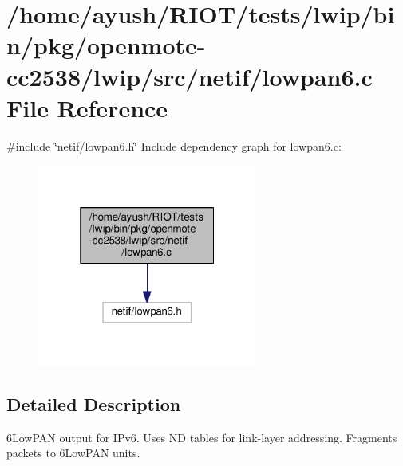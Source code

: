 \hypertarget{openmote-cc2538_2lwip_2src_2netif_2lowpan6_8c}{}\section{/home/ayush/\+R\+I\+O\+T/tests/lwip/bin/pkg/openmote-\/cc2538/lwip/src/netif/lowpan6.c File Reference}
\label{openmote-cc2538_2lwip_2src_2netif_2lowpan6_8c}
{\ttfamily \#include \char`\"{}netif/lowpan6.\+h\char`\"{}}\newline
Include dependency graph for lowpan6.\+c\+:
\nopagebreak
\begin{figure}[H]
\begin{center}
\leavevmode
\includegraphics[width=205pt]{openmote-cc2538_2lwip_2src_2netif_2lowpan6_8c__incl}
\end{center}
\end{figure}


\subsection{Detailed Description}
6\+Low\+P\+AN output for I\+Pv6. Uses ND tables for link-\/layer addressing. Fragments packets to 6\+Low\+P\+AN units. 